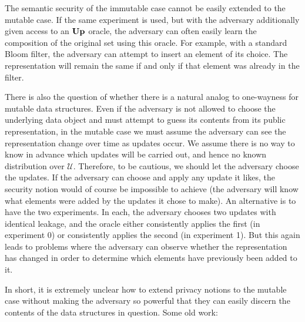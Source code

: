 \newcommand{\INITO}{\oraclefont{Init}}

The semantic security of the immutable case cannot be easily extended to the mutable case. If the same experiment is used, but with the adversary additionally given access to an $\mathbf{Up}\hspace{0.5pt}$ oracle, the adversary can often easily learn the composition of the original set using this oracle. For example, with a standard Bloom filter, the adversary can attempt to insert an element of its choice. The representation will remain the same if and only if that element was already in the filter.

There is also the question of whether there is a natural analog to one-wayness for mutable data structures. Even if the adversary is not allowed to choose the underlying data object and must attempt to guess its contents from its public representation, in the mutable case we must assume the adversary can see the representation change over time as updates occur. We assume there is no way to know in advance which updates will be carried out, and hence no known distribution over $\mathcal{U}$. Therefore, to be cautious, we should let the adversary choose the updates. If the adversary can choose and apply any update it likes, the security notion would of course be impossible to achieve (the adversary will know what elements were added by the updates it chose to make). An alternative is to have the two experiments. In each, the adversary chooses two updates with identical leakage, and the oracle either consistently applies the first (in experiment 0) or consistently applies the second (in experiment 1). But this again leads to problems where the adversary can observe whether the representation has changed in order to determine which elements have previously been added to it.

In short, it is extremely unclear how to extend privacy notions to the mutable case without making the adversary so powerful that they can easily discern the contents of the data structures in question. Some old work:


